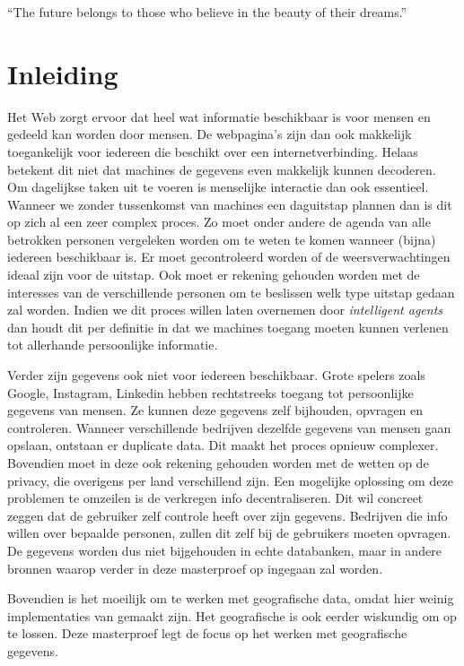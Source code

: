 \begin{savequote}[0.55\linewidth]
	``The future belongs to those who believe in the beauty of their dreams.''
\end{savequote}

\chapter{Inleiding}
Het Web zorgt ervoor dat heel wat informatie beschikbaar is voor mensen en gedeeld kan worden door mensen. De webpagina’s zijn dan ook makkelijk toegankelijk voor iedereen die beschikt over een internetverbinding. Helaas betekent dit niet dat machines de gegevens even makkelijk kunnen decoderen. Om dagelijkse taken uit te voeren is menselijke interactie dan ook essentieel. Wanneer we zonder tussenkomst van machines een daguitstap plannen dan is dit op zich al een zeer complex proces. Zo moet onder andere de agenda van alle betrokken personen vergeleken worden om te weten te komen wanneer (bijna) iedereen beschikbaar is. Er moet gecontroleerd worden of de weersverwachtingen ideaal zijn voor de uitstap. Ook moet er rekening gehouden worden met de interesses van de verschillende personen om te beslissen welk type uitstap gedaan zal worden. Indien we dit proces willen laten overnemen door \textit{intelligent agents} dan houdt dit per definitie in dat we machines toegang moeten kunnen verlenen tot allerhande persoonlijke informatie.

Verder zijn gegevens ook niet voor iedereen beschikbaar. Grote spelers zoals Google, Instagram, Linkedin hebben rechtstreeks toegang tot persoonlijke gegevens van mensen. Ze kunnen deze gegevens zelf bijhouden, opvragen en controleren. Wanneer verschillende bedrijven dezelfde gegevens van mensen gaan opslaan, ontstaan er duplicate data. Dit maakt het proces opnieuw complexer. Bovendien moet in deze ook rekening gehouden worden met de wetten op de privacy, die overigens per land verschillend zijn.  Een mogelijke oplossing om deze problemen te omzeilen is de verkregen info decentraliseren. Dit wil concreet zeggen dat de gebruiker zelf controle heeft over zijn gegevens. Bedrijven die info willen over bepaalde personen, zullen dit zelf bij de gebruikers moeten opvragen. De gegevens worden dus niet bijgehouden in echte databanken, maar in andere bronnen waarop verder in deze masterproef op ingegaan zal worden.

Bovendien is het moeilijk om te werken met geografische data, omdat hier weinig implementaties van gemaakt zijn. Het geografische is ook eerder wiskundig om op te lossen. Deze masterproef legt de focus op het werken met geografische gegevens.

